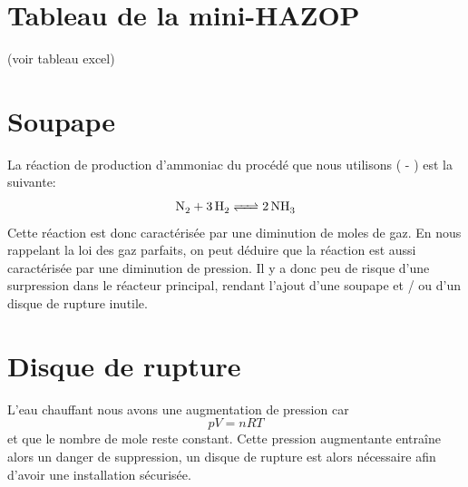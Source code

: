 \documentclass[a4paper,12pt, oneside]{article}
\begin{document}
\section{Tableau de la mini-HAZOP}

(voir tableau excel)

\section{Soupape}
La réaction de production d'ammoniac du procédé que nous utilisons ( - ) est la suivante:
$$\ce{N2 +3H2 <=> 2NH3}$$
Cette réaction est donc caractérisée par une diminution de moles de gaz. En nous rappelant la loi des gaz parfaits, on peut déduire que la réaction est aussi caractérisée par une diminution de pression. Il y a donc peu de risque d'une surpression dans le réacteur principal, rendant l'ajout d'une soupape et / ou d'un disque de rupture inutile.

\section{Disque de rupture}
L'eau chauffant nous avons une augmentation de pression car $$pV=nRT$$ et que le nombre de mole reste constant. Cette pression augmentante entraîne alors un danger de suppression, un disque de rupture est alors nécessaire afin d'avoir une installation sécurisée.
\end{document}
